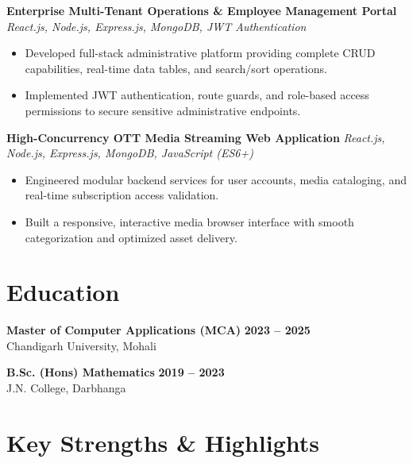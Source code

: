 \documentclass[a4paper,10pt]{article}
\begin{document}
\textbf{Enterprise Multi-Tenant Operations \& Employee Management Portal}
\hfill
\textit{React.js, Node.js, Express.js, MongoDB, JWT Authentication}

\begin{itemize}

    \item Developed full-stack administrative platform providing complete CRUD capabilities, real-time data tables, and search/sort operations.

    \item Implemented JWT authentication, route guards, and role-based access permissions to secure sensitive administrative endpoints.

\end{itemize}


\textbf{High-Concurrency OTT Media Streaming Web Application}
\hfill
\textit{React.js, Node.js, Express.js, MongoDB, JavaScript (ES6+)}

\begin{itemize}

    \item Engineered modular backend services for user accounts, media cataloging, and real-time subscription access validation.

    \item Built a responsive, interactive media browser interface with smooth categorization and optimized asset delivery.

\end{itemize}

\section*{Education}

\textbf{Master of Computer Applications (MCA)}
\hfill
\textbf{2023 -- 2025}
\\
Chandigarh University, Mohali

\vspace{3pt}

\textbf{B.Sc. (Hons) Mathematics}
\hfill
\textbf{2019 -- 2023}
\\
J.N. College, Darbhanga

\section*{Key Strengths \& Highlights}
\end{document}
